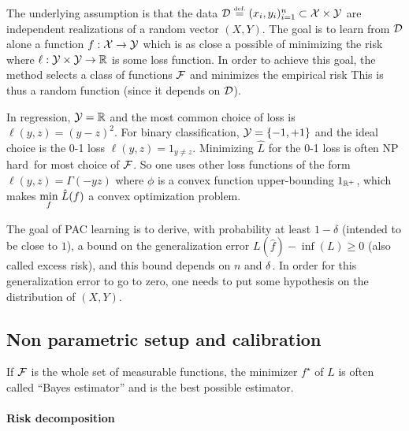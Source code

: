 


The underlying assumption is that the data $\mathcal{D} \stackrel{\mbox{\upshape\tiny def.}}{=} (x_i,y_i)_{i=1}^n \subset \mathcal{X} \times \mathcal{Y}$ are independent realizations of a random vector $(X,Y)$. The goal is to learn from $\mathcal{D}$ alone a function $f : \mathcal{X} \rightarrow \mathcal{Y}$ which is as close a possible of minimizing the risk 
where $\ell : \mathcal{Y} \times \mathcal{Y} \rightarrow \mathbb{R}$ is some loss function. 
%
In order to achieve this goal, the method selects a class of functions $\mathcal{F}$ and minimizes the empirical risk 
This is thus a random function (since it depends on $\mathcal{D}$).  

\begin{exmp}
	In regression, $\mathcal{Y}=\mathbb{R}$ and the most common choice of loss is $\ell(y,z) = (y-z)^2$.
	For binary classification, $\mathcal{Y}=\{-1,+1\}$ and the ideal choice is the 0-1 loss $\ell(y,z)=1_{y \neq z}$.
	Minimizing $\hat L$ for the 0-1 loss is often NP hard for most choice of $\mathcal{F}$.  So one uses other loss functions of the form $\ell(y,z) = \Gamma(-yz)$ where $\phi$ is a convex function upper-bounding $1_{\mathbb{R}^+}$, which makes $\underset{f}{\min}\; \hat L(f)$ a convex optimization problem. 
	\end{exmp}
	
The goal of PAC learning is to derive, with probability at least $1-\delta$ (intended to be close to $1$), a bound on the generalization error $L(\hat f) - \inf(L) \geq 0$ (also called excess risk), and this bound  depends on $n$ and $\delta$. In order for this generalization error to go to zero, one needs to put some hypothesis on the distribution of $(X,Y)$. 


\subsection{Non parametric setup and calibration}

If $\mathcal{F}$ is the whole set of measurable functions, the minimizer $f^\star$ of $L$ is often called ``Bayes estimator'' and is the best possible estimator. 


\paragraph{Risk decomposition}

